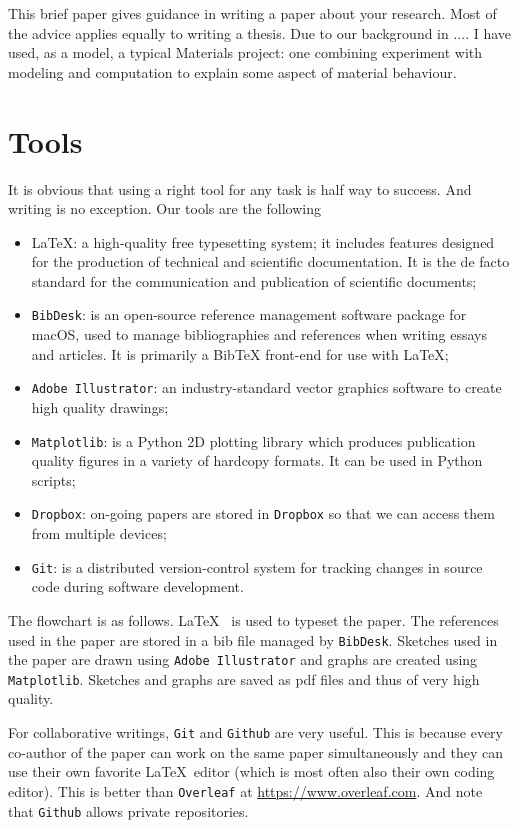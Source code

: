 \documentclass[authoryear,3p,times,preprint,review,fleqn]{elsarticle}
\numberwithin{equation}{section}
\theoremstyle{remark}
\begin{document}
This brief paper gives guidance in writing a paper about your research. Most of the advice applies equally to writing a thesis. Due to our background in .... I have used, as a model, a typical Materials project: one combining experiment with modeling and computation to explain some aspect of material behaviour.

\section{Tools}\label{sec:tools}

It is obvious that using a right tool for any task is half way to success. And writing is no exception. Our tools are the following

\begin{itemize}
\item \LaTeX:  a high-quality free typesetting system; it includes features designed for the production of technical and scientific documentation. It is the de facto standard for the communication and publication of scientific documents;
\item \texttt{BibDesk}:  is an open-source reference management software package for macOS, used to manage bibliographies and references when writing essays and articles. It is primarily a BibTeX front-end for use with \LaTeX;
\item \texttt{Adobe Illustrator}: an industry-standard vector graphics software to create high quality drawings;
\item \texttt{Matplotlib}: is a Python 2D plotting library which produces publication quality figures in a variety of hardcopy formats. It can be used in Python scripts;
\item \texttt{Dropbox}: on-going papers are stored in \texttt{Dropbox} so that we can access them from multiple devices;
\item \texttt{Git}: is a distributed version-control system for tracking changes in source code during software development. 
\end{itemize}

The flowchart is as follows. \LaTeX~ is used to typeset the paper. The references used in the paper are stored in a bib file managed by \texttt{BibDesk}. Sketches used in the paper are drawn using \texttt{Adobe Illustrator} and graphs are created using \texttt{Matplotlib}. Sketches and graphs are saved as pdf files and thus of very high quality.

For collaborative writings, \texttt{Git} and \texttt{Github} are very useful. This is because every co-author of the paper can work on the same paper simultaneously and they can use their own favorite \LaTeX\ editor (which is most often also their own coding editor). This is better than \texttt{Overleaf} at \url{https://www.overleaf.com}. And note that \texttt{Github} allows private repositories.
\end{document}
